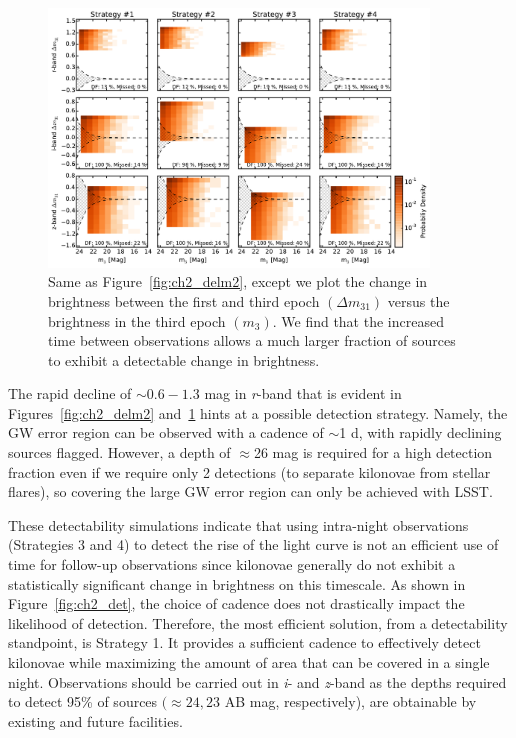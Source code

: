 \begin{figure}[t!]
\centering
\includegraphics[width=0.9\textwidth]{./figs/chapter2/ch2_f7.pdf}
\caption{Same as Figure~\ref{fig:ch2_delm2}, except we plot the change in brightness between the first and third epoch $(\Delta m_{31})$ versus the brightness in the third epoch $(m_3)$. We find that the increased time between observations allows a much larger fraction of sources to exhibit a detectable change in brightness.}
\label{fig:ch2_delm3}
\end{figure}

The rapid decline of $\sim0.6-1.3$ mag in {\em r}-band that is evident in Figures~\ref{fig:ch2_delm2} and~\ref{fig:ch2_delm3} hints at a possible detection strategy. Namely, the GW error region can be observed with a cadence of $\sim$1 d, with rapidly declining sources flagged. However, a depth of $\approx$26 mag is required for a high detection fraction even if we require only 2 detections (to separate kilonovae from stellar flares), so covering the large GW error region can only be achieved with LSST.

These detectability simulations indicate that using intra-night observations (Strategies 3 and 4) to detect the rise of the light curve is not an efficient use of time for follow-up observations since kilonovae generally do not exhibit a statistically significant change in brightness on this timescale. As shown in Figure~\ref{fig:ch2_det}, the choice of cadence does not drastically impact the likelihood of detection. Therefore, the most efficient solution, from a detectability standpoint, is Strategy 1. It provides a sufficient cadence to effectively detect kilonovae while maximizing the amount of area that can be covered in a single night. Observations should be carried out in {\em i}- and {\em z}-band as the depths required to detect 95\% of sources $(\approx 24,23$ AB mag, respectively), are obtainable by existing and future facilities.

